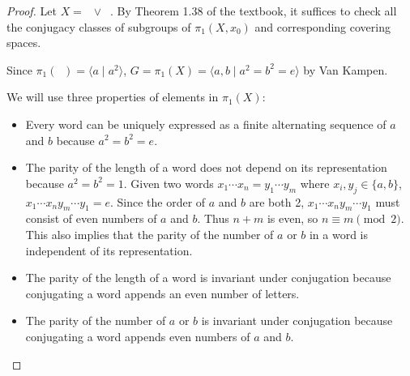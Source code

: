 \documentclass[12pt, psamsfonts]{amsart}
\theoremstyle{definition}
\theoremstyle{remark}
\DeclareMathOperator{\RP}{\mathbb{R}\mathbf{P}^2}
\numberwithin{equation}{section}
\begin{document}
\begin{proof}
  Let $X = \RP \vee \RP$.
  By Theorem 1.38 of the textbook, it suffices to check all the conjugacy classes of subgroups of $\pi_1(X, x_0)$ and corresponding covering spaces.

  Since $\pi_1(\RP) = \langle a \mid a^2 \rangle$, $G = \pi_1(X) = \langle a, b \mid a^2 = b^2 = e \rangle$ by Van Kampen.

  We will use three properties of elements in $\pi_1(X)$:

  \begin{itemize}
    \item
      Every word can be uniquely expressed as a finite alternating sequence of $a$ and $b$ because $a^2 = b^2 = e$.
    \item
      The parity of the length of a word does not depend on its representation because $a^2 = b^2 = 1$.
      Given two words $x_1 \cdots x_n = y_1 \cdots y_m$ where $x_i, y_j \in \{ a, b \}$, $x_1 \cdots x_n y_m \cdots y_1 = e$.
      Since the order of $a$ and $b$ are both 2, $x_1 \cdots x_n y_m \cdots y_1$ must consist of even numbers of $a$ and $b$.
      Thus $n + m$ is even, so $n \equiv m \pmod 2$.
      This also implies that the parity of the number of $a$ or $b$ in a word is independent of its representation.
    \item
      The parity of the length of a word is invariant under conjugation because conjugating a word appends an even number of letters.
    \item
      The parity of the number of $a$ or $b$ is invariant under conjugation because conjugating a word appends even numbers of $a$ and $b$.
  \end{itemize}


\end{proof}
\end{document}
